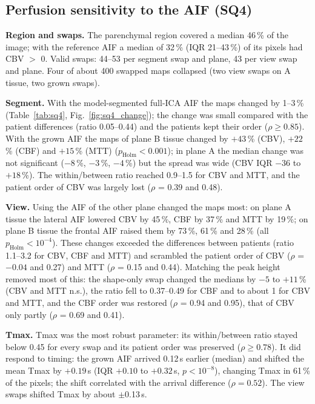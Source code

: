 \subsection{Perfusion sensitivity to the AIF (SQ4)}
\label{sec:sq4_results}

\textbf{Region and swaps.} The parenchymal region covered a median 46\,\% of the image; with the reference AIF a
median of 32\,\% (IQR 21--43\,\%) of its pixels had CBV $>$ 0. Valid swaps: 44--53 per segment swap and plane, 43 per
view swap and plane. Four of about 400 swapped maps collapsed (two view swaps on A tissue, two grown swaps).

\textbf{Segment.} With the model-segmented full-ICA AIF the maps changed by 1--3\,\%
(Table~\ref{tab:sq4}, Fig.~\ref{fig:sq4_change}); the change was small compared with the patient differences (ratio
0.05--0.44) and the patients kept their order ($\rho \geq 0.85$). With the grown AIF the maps of plane B tissue
changed by $+43$\,\% (CBV), $+22$\,\% (CBF) and $+15$\,\% (MTT) ($p_\mathrm{Holm} < 0.001$); in plane A the median change
was not significant ($-8$\,\%, $-3$\,\%, $-4$\,\%) but the spread was wide (CBV IQR $-36$ to $+18$\,\%). The within/between
ratio reached 0.9--1.5 for CBV and MTT, and the patient order of CBV was largely lost ($\rho$ = 0.39 and 0.48).

\textbf{View.} Using the AIF of the other plane changed the maps most: on plane A tissue the lateral AIF lowered CBV
by 45\,\%, CBF by 37\,\% and MTT by 19\,\%; on plane B tissue the frontal AIF raised them by 73\,\%, 61\,\% and 28\,\%
(all $p_\mathrm{Holm} < 10^{-4}$). These changes exceeded the differences between patients (ratio 1.1--3.2 for CBV, CBF and
MTT) and scrambled the patient order of CBV ($\rho$ = $-0.04$ and 0.27) and MTT ($\rho$ = 0.15 and 0.44). Matching the
peak height removed most of this: the shape-only swap changed the medians by $-5$ to $+11$\,\% (CBV and MTT n.s.), the
ratio fell to 0.37--0.49 for CBF and to about 1 for CBV and MTT, and the CBF order was restored ($\rho$ = 0.94 and 0.95),
that of CBV only partly ($\rho$ = 0.69 and 0.41).

\textbf{Tmax.} Tmax was the most robust parameter: its within/between ratio stayed below 0.45 for every swap and its
patient order was preserved ($\rho \geq 0.78$). It did respond to timing: the grown AIF arrived 0.12\,s earlier
(median) and shifted the mean Tmax by $+0.19$\,s (IQR $+0.10$ to $+0.32$\,s, $p < 10^{-8}$), changing Tmax in 61\,\% of the
pixels; the shift correlated with the arrival difference ($\rho = 0.52$). The view swaps shifted Tmax by about
$\pm$0.13\,s.


